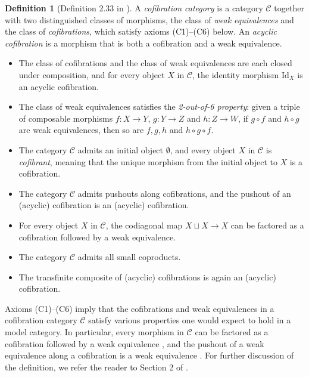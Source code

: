 \documentclass[a4paper, 11 pt, oneside, reqno]{amsart}
\numberwithin{lemma}{section}
\theoremstyle{definition}
\newtheorem{definition}[lemma]{Definition}
\newcommand{\demph}[1]{\emph{#1}}
\newcommand{\cl}[1]{\mathcal{#1}}
\begin{document}
\begin{definition}[Definition 2.33 in \cite{CDKOSW}]\label{def:cofibration-category}
    A \demph{cofibration category} is a category \(\cl{C}\) together with two distinguished classes of morphisms, the class of \demph{weak equivalences} and the class of \demph{cofibrations}, which satisfy axioms (C1)--(C6) below. An \demph{acyclic cofibration} is a morphism that is both a cofibration and a weak equivalence.
    \begin{itemize}
        \item [(C1)] The class of cofibrations and the class of weak equivalences are each closed under composition, and for every object \(X\) in \(\cl{C}\), the identity morphism \(\mathrm{Id}_X\) is an acyclic cofibration. 
        \item [(C2)] The class of weak equivalences satisfies the \emph{2-out-of-6 property}: given a triple of composable morphisms \(f \colon X \to Y\), \(g\colon Y \to Z\) and \(h\colon Z \to W\), if \(g \circ f\) and \(h \circ g\) are weak equivalences, then so are \(f,g,h\) and \(h \circ g \circ f\).
        \item [(C3)] 
        The category \(\cl{C}\) admits an initial object \(\emptyset\), and every object \(X\) in \(\cl{C}\) is \demph{cofibrant}, meaning that the unique morphism from the initial object to \(X\) is a cofibration.
        \item [(C4)] 
        The category \(\cl{C}\) admits pushouts along cofibrations, and the pushout of an (acyclic) cofibration is an (acyclic) cofibration.
        \item [(C5)] For every object \(X\) in \(\cl{C}\), the codiagonal map \(X \sqcup X \to X\) can be factored as a cofibration followed by a weak equivalence.
        \item [(C6)] The category \(\cl{C}\) admits all small coproducts.
        \item [(C7)] The transfinite composite of (acyclic) cofibrations is again an (acyclic) cofibration.
    \end{itemize}
\end{definition}

Axioms (C1)--(C6) imply that the cofibrations and weak equivalences in a cofibration category \(\cl{C}\) satisfy various properties one would expect to hold in a model category. In particular, every morphism in \(\cl{C}\) can be factored as a cofibration followed by a weak equivalence \cite[p.~421]{Brown1973}, and the pushout of a weak equivalence along a cofibration is a weak equivalence \cite[Lemma I.4.2]{Brown1973}. For further discussion of the definition, we refer the reader to Section 2 of \cite{CDKOSW}. 
\end{document}
